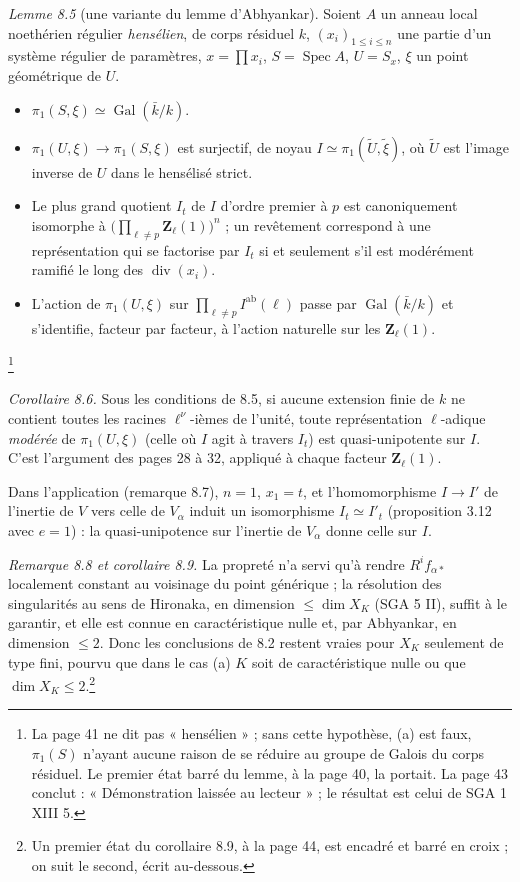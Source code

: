 \documentclass[11pt,a4paper]{article}
\begin{document}
\emph{Lemme 8.5} (une variante du lemme d'Abhyankar). Soient $A$ un anneau local
noethérien régulier \emph{hensélien}, de corps résiduel $k$, $(x_i)_{1 \leq i
\leq n}$ une partie d'un système régulier de paramètres, $x = \prod x_i$,
$S = \operatorname{Spec} A$, $U = S_x$, $\xi$ un point géométrique de $U$.
\begin{itemize}
  \item[(a)] $\pi_1(S, \xi) \simeq \operatorname{Gal}(\bar k / k)$.
  \item[(b)] $\pi_1(U,\xi) \to \pi_1(S,\xi)$ est surjectif, de noyau
    $I \simeq \pi_1(\widetilde U, \tilde\xi)$, où $\widetilde U$ est l'image
    inverse de $U$ dans le hensélisé strict.
  \item[(c)] Le plus grand quotient $I_t$ de $I$ d'ordre premier à $p$ est
    canoniquement isomorphe à $\bigl(\prod_{\ell\neq p}\mathbf{Z}_\ell(1)\bigr)^n$ ;
    un revêtement correspond à une représentation qui se factorise par $I_t$ si
    et seulement s'il est modérément ramifié le long des
    $\operatorname{div}(x_i)$.
  \item[(d)] L'action de $\pi_1(U,\xi)$ sur $\prod_{\ell \neq p}
    I^{\mathrm{ab}}(\ell)$ passe par $\operatorname{Gal}(\bar k/k)$ et
    s'identifie, facteur par facteur, à l'action naturelle sur les
    $\mathbf{Z}_\ell(1)$.
\end{itemize}
\footnote{La page 41 ne dit pas « hensélien » ; sans cette hypothèse, (a) est
faux, $\pi_1(S)$ n'ayant aucune raison de se réduire au groupe de Galois du
corps résiduel. Le premier état barré du lemme, à la page 40, la portait. La
page 43 conclut : « Démonstration laissée au lecteur » ; le résultat est celui
de SGA 1 XIII 5.} 

\emph{Corollaire 8.6.} Sous les conditions de 8.5, si aucune extension finie de
$k$ ne contient toutes les racines $\ell^\nu$-ièmes de l'unité, toute
représentation $\ell$-adique \emph{modérée} de $\pi_1(U,\xi)$ (celle où $I$
agit à travers $I_t$) est quasi-unipotente sur $I$. C'est l'argument des
pages 28 à 32, appliqué à chaque facteur $\mathbf{Z}_\ell(1)$.

Dans l'application (remarque 8.7), $n = 1$, $x_1 = t$, et l'homomorphisme
$I \to I'$ de l'inertie de $V$ vers celle de $V_\alpha$ induit un isomorphisme
$I_t \simeq I'_t$ (proposition 3.12 avec $e = 1$) : la quasi-unipotence sur
l'inertie de $V_\alpha$ donne celle sur $I$.

\emph{Remarque 8.8 et corollaire 8.9.} La propreté n'a servi qu'à rendre
$R^i f_{\alpha *}$ localement constant au voisinage du point générique ; la
résolution des singularités au sens de Hironaka, en dimension $\leq \dim X_K$
(SGA 5 II), suffit à le garantir, et elle est connue en caractéristique nulle et,
par Abhyankar, en dimension $\leq 2$. Donc les conclusions de 8.2 restent vraies
pour $X_K$ seulement de type fini, pourvu que dans le cas (a) $K$ soit de
caractéristique nulle ou que $\dim X_K \leq 2$.\footnote{Un premier état du
corollaire 8.9, à la page 44, est encadré et barré en croix ; on suit le
second, écrit au-dessous.}
\end{document}
